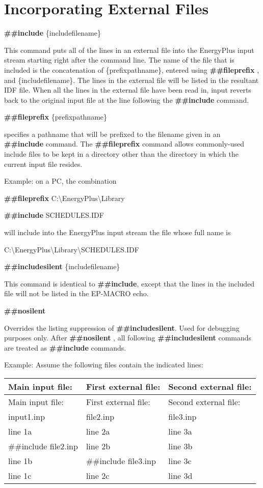 \section{Incorporating External Files}\label{incorporating-external-files}

\textbf{\#\#include} \{includefilename\}

This command puts all of the lines in an external file into the EnergyPlus input stream starting right after the command line. The name of the file that is included is the concatenation of \{prefixpathname\}, entered using \textbf{\#\#fileprefix} , and \{includefilename\}. The lines in the external file will be listed in the resultant IDF file. When all the lines in the external file have been read in, input reverts back to the original input file at the line following the \textbf{\#\#include} command.

\textbf{\#\#fileprefix} \{prefixpathname\}

specifies a pathname that will be prefixed to the filename given in an \textbf{\#\#include} command. The \textbf{\#\#fileprefix} command allows commonly-used include files to be kept in a directory other than the directory in which the current input file resides.

Example: on a PC, the combination

\textbf{\#\#fileprefix} C:\textbackslash{}EnergyPlus\textbackslash{}Library

\textbf{\#\#include} SCHEDULES.IDF

will include into the EnergyPlus input stream the file whose full name is

C:\textbackslash{}EnergyPlus\textbackslash{}Library\textbackslash{}SCHEDULES.IDF

\textbf{\#\#includesilent} \{includefilename\}

This command is identical to \textbf{\#\#include}, except that the lines in the included file will not be listed in the EP-MACRO echo.

\textbf{\#\#nosilent}

Overrides the listing suppression of \textbf{\#\#includesilent}. Used for debugging purposes only. After \textbf{\#\#nosilent} , all following \textbf{\#\#includesilent} commands are treated as \textbf{\#\#include} commands.

Example: Assume the following files contain the indicated lines:

\begin{longtable}[c]{@{}lll@{}}
\toprule 
Main input file: & First external file: & Second external file: \tabularnewline
\midrule
\endfirsthead

\toprule 
Main input file: & First external file: & Second external file: \tabularnewline
\midrule
\endhead

input1.inp & file2.inp & file3.inp \tabularnewline
line 1a & line 2a & line 3a \tabularnewline
\#\#include file2.inp & line 2b & line 3b \tabularnewline
line 1b & \#\#include file3.inp & line 3c \tabularnewline
line 1c & line 2c & line 3d \tabularnewline
\bottomrule
\end{longtable}

